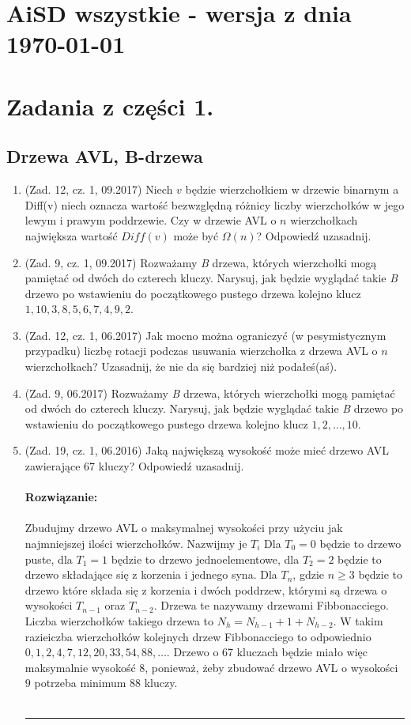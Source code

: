 \documentclass[10pt]{article}%
\newcommand{\beginsolution}{\textbf{\\~\\ \textbf{Rozwiązanie:} \\~\\}}
\newcommand{\finishsolution}{~\\~\\ \noindent\rule{11cm}{0.4pt}}
\begin{document}
\section*{AiSD wszystkie - wersja z dnia \today}

\tableofcontents

\section{Zadania z części 1.}


\subsection{Drzewa AVL, B-drzewa}

\begin{enumerate}

\item (Zad. 12, cz. 1, 09.2017) Niech $v$ będzie wierzchołkiem w drzewie binarnym a Diff(v) niech oznacza wartość bezwzględną różnicy liczby wierzchołków  w jego lewym i prawym poddrzewie. Czy w drzewie AVL o $n$ wierzchołkach największa wartość $Diff(v)$ może być $\Omega(n)$? Odpowiedź uzasadnij.

\item (Zad. 9, cz. 1, 09.2017) Rozważamy \emph{B} drzewa, których wierzchołki mogą pamiętać od dwóch do czterech kluczy. Narysuj, jak będzie wyglądać takie \emph{B} drzewo po wstawieniu do początkowego pustego drzewa kolejno klucz $1, 10, 3, 8, 5, 6, 7, 4, 9, 2$.

\item (Zad. 12, cz. 1, 06.2017) Jak mocno można ograniczyć (w pesymistycznym przypadku) liczbę rotacji podczas usuwania wierzchołka z drzewa AVL o $n$ wierzchołkach? Uzasadnij, że nie da się bardziej niż podałeś(aś).

\item (Zad. 9, 06.2017) Rozważamy \emph{B} drzewa, których wierzchołki mogą pamiętać od dwóch do czterech kluczy. Narysuj, jak będzie wyglądać takie \emph{B} drzewo po wstawieniu do początkowego pustego drzewa kolejno klucz $1,2,\ldots,10$.

\item (Zad. 19, cz. 1, 06.2016) Jaką największą wysokość może mieć drzewo AVL zawierające 67 kluczy? Odpowiedź uzasadnij.
\beginsolution
Zbudujmy drzewo AVL o maksymalnej wysokości przy użyciu jak najmniejszej ilości wierzchołków. Nazwijmy je $T_i$ Dla $T_0 = 0$ będzie to drzewo puste, dla $T_1 = 1$ będzie to drzewo jednoelementowe, dla $T_2 = 2$ będzie to drzewo składające się z korzenia i jednego syna. Dla $T_n$, gdzie $n \geq 3$ będzie to drzewo które składa się z korzenia i dwóch poddrzew, którymi są drzewa o wysokości $T_{n-1}$ oraz $T_{n-2}$. Drzewa te nazywamy drzewami Fibbonacciego. Liczba wierzchołków takiego drzewa to $N_h = N_{h-1} + 1 + N_{h-2}$. W takim razieiczba wierzchołków kolejnych drzew Fibbonacciego to odpowiednio $0, 1, 2, 4, 7, 12, 20, 33, 54, 88, \ldots $. Drzewo o 67 kluczach będzie miało więc maksymalnie wysokość 8, ponieważ, żeby zbudować drzewo AVL o wysokości $9$ potrzeba minimum 88 kluczy. 
\finishsolution


\end{enumerate}
\end{document}

